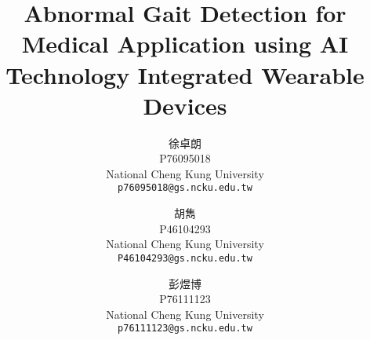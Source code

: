 \documentclass[10pt,twocolumn,letterpaper]{article}
\begin{document}
\title{Abnormal Gait Detection for Medical Application using AI Technology Integrated Wearable Devices}

\author{
    \begin{CJK*}{UTF8}{bkai}
        徐卓朗
    \end{CJK*}
    P76095018\\
    National Cheng Kung University\\
    {\tt\small p76095018@gs.ncku.edu.tw}
    \and
    \begin{CJK*}{UTF8}{bkai}
        胡雋
    \end{CJK*}
    P46104293\\
    National Cheng Kung University\\
    {\tt\small P46104293@gs.ncku.edu.tw}
    \and
    \begin{CJK*}{UTF8}{bkai}
        彭煜博
    \end{CJK*}
    P76111123\\
    National Cheng Kung University\\
    {\tt\small p76111123@gs.ncku.edu.tw}
}
\maketitle


  
\end{document}
